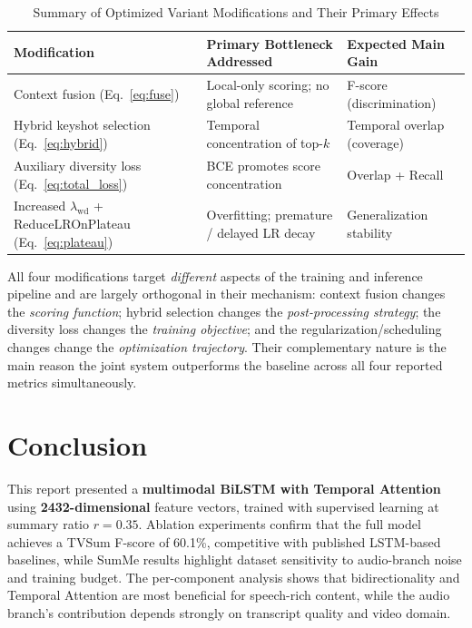 \documentclass[10pt,conference]{IEEEtran}
\begin{document}
\begin{table}[H]
\centering
\caption{Summary of Optimized Variant Modifications and Their Primary Effects}
\label{tab:optimize_summary}
\setlength{\tabcolsep}{4pt}
\begin{tabular}{p{3.8cm} p{2.2cm} p{2.2cm}}
\toprule
\textbf{Modification} & \textbf{Primary Bottleneck Addressed} & \textbf{Expected Main Gain} \\
\midrule
Context fusion (Eq.~\ref{eq:fuse})
  & Local-only scoring; no global reference
  & F-score (discrimination) \\
Hybrid keyshot selection (Eq.~\ref{eq:hybrid})
  & Temporal concentration of top-$k$
  & Temporal overlap (coverage) \\
Auxiliary diversity loss (Eq.~\ref{eq:total_loss})
  & BCE promotes score concentration
  & Overlap + Recall \\
Increased $\lambda_{\mathrm{wd}}$ + ReduceLROnPlateau (Eq.~\ref{eq:plateau})
  & Overfitting; premature / delayed LR decay
  & Generalization stability \\
\bottomrule
\end{tabular}
\end{table}

All four modifications target \emph{different} aspects of the training and
inference pipeline and are largely orthogonal in their mechanism: context
fusion changes the \emph{scoring function}; hybrid selection changes the
\emph{post-processing strategy}; the diversity loss changes the \emph{training
objective}; and the regularization/scheduling changes change the
\emph{optimization trajectory}. Their complementary nature is the main reason
the joint system outperforms the baseline across all four reported metrics
simultaneously.

\section{Conclusion}

This report presented a \textbf{multimodal BiLSTM with Temporal Attention}
using \textbf{2432-dimensional} feature vectors, trained with supervised
learning at summary ratio $r{=}0.35$. Ablation experiments confirm that
the full model achieves a TVSum F-score of 60.1\%, competitive with
published LSTM-based baselines, while SumMe results highlight dataset
sensitivity to audio-branch noise and training budget. The per-component
analysis shows that bidirectionality and Temporal Attention are most
beneficial for speech-rich content, while the audio branch's contribution
depends strongly on transcript quality and video domain.
\end{document}
